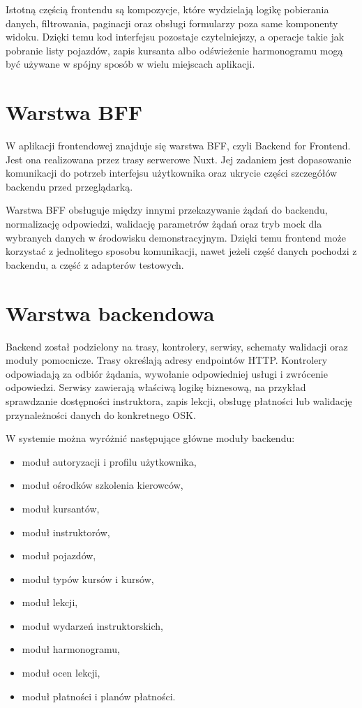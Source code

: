 Istotną częścią frontendu są kompozycje, które wydzielają logikę pobierania danych, filtrowania, paginacji oraz obsługi formularzy poza same komponenty widoku. Dzięki temu kod interfejsu pozostaje czytelniejszy, a operacje takie jak pobranie listy pojazdów, zapis kursanta albo odświeżenie harmonogramu mogą być używane w spójny sposób w wielu miejscach aplikacji.

\section{Warstwa BFF}
\label{sec:warstwa-bff}

W aplikacji frontendowej znajduje się warstwa BFF, czyli Backend for Frontend. Jest ona realizowana przez trasy serwerowe Nuxt. Jej zadaniem jest dopasowanie komunikacji do potrzeb interfejsu użytkownika oraz ukrycie części szczegółów backendu przed przeglądarką.

Warstwa BFF obsługuje między innymi przekazywanie żądań do backendu, normalizację odpowiedzi, walidację parametrów żądań oraz tryb mock dla wybranych danych w środowisku demonstracyjnym. Dzięki temu frontend może korzystać z jednolitego sposobu komunikacji, nawet jeżeli część danych pochodzi z backendu, a część z adapterów testowych.

\section{Warstwa backendowa}
\label{sec:warstwa-backendowa}

Backend został podzielony na trasy, kontrolery, serwisy, schematy walidacji oraz moduły pomocnicze. Trasy określają adresy endpointów HTTP. Kontrolery odpowiadają za odbiór żądania, wywołanie odpowiedniej usługi i zwrócenie odpowiedzi. Serwisy zawierają właściwą logikę biznesową, na przykład sprawdzanie dostępności instruktora, zapis lekcji, obsługę płatności lub walidację przynależności danych do konkretnego OSK.

W systemie można wyróżnić następujące główne moduły backendu:
\begin{itemize}
    \item moduł autoryzacji i profilu użytkownika,
    \item moduł ośrodków szkolenia kierowców,
    \item moduł kursantów,
    \item moduł instruktorów,
    \item moduł pojazdów,
    \item moduł typów kursów i kursów,
    \item moduł lekcji,
    \item moduł wydarzeń instruktorskich,
    \item moduł harmonogramu,
    \item moduł ocen lekcji,
    \item moduł płatności i planów płatności.
\end{itemize}

